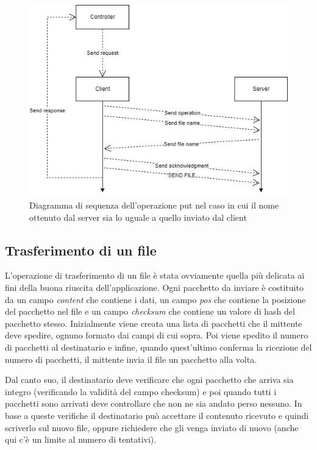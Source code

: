\documentclass[a4paper,12pt]{report}
\begin{document}
\begin{figure}[H]
    \centering
    \includegraphics[scale=0.55]{img/put.jpg}
    \caption{Diagramma di sequenza dell'operazione put nel caso in cui il nome ottenuto dal server sia lo uguale a quello inviato dal client}
\end{figure}

\subsection{Trasferimento di un file}
L'operazione di trasferimento di un file è stata ovviamente quella più delicata ai fini della buona riuscita dell'applicazione.
Ogni pacchetto da inviare è costituito da un campo \textit{content} che contiene i dati, un campo \textit{pos} che contiene la posizione del pacchetto nel file e un campo \textit{checksum} che contiene un valore di hash del pacchetto stesso.
Inizialmente viene creata una lista di pacchetti che il mittente deve spedire, ognuno formato dai campi di cui sopra. Poi viene spedito il numero di pacchetti al destinatario e infine, quando quest'ultimo conferma la ricezione del numero di pacchetti, il mittente invia il file un pacchetto alla volta.

Dal canto suo, il destinatario deve verificare che ogni pacchetto che arriva sia integro (verificando la validità del campo checksum) e poi quando tutti i pacchetti sono arrivati deve controllare che non ne sia andato perso nessuno. In base a queste verifiche il destinatario può accettare il contenuto ricevuto e quindi scriverlo sul nuovo file, oppure richiedere che gli venga inviato di nuovo (anche qui c'è un limite al numero di tentativi).
\end{document}
